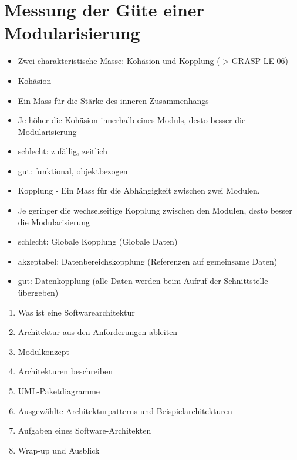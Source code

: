 \documentclass[10pt]{article}
\begin{document}
\section*{Messung der Güte einer Modularisierung}
\begin{itemize}
  \item Zwei charakteristische Masse: Kohäsion und Kopplung (-> GRASP LE 06)
  \item Kohäsion
  \item Ein Mass für die Stärke des inneren Zusammenhangs
  \item Je höher die Kohäsion innerhalb eines Moduls, desto besser die Modularisierung
  \item schlecht: zufällig, zeitlich
  \item gut: funktional, objektbezogen
  \item Kopplung - Ein Mass für die Abhängigkeit zwischen zwei Modulen.
  \item Je geringer die wechselseitige Kopplung zwischen den Modulen, desto besser die Modularisierung
  \item schlecht: Globale Kopplung (Globale Daten)
  \item akzeptabel: Datenbereichskopplung (Referenzen auf gemeinsame Daten)
  \item gut: Datenkopplung (alle Daten werden beim Aufruf der Schnittstelle übergeben)
\end{itemize}

\begin{enumerate}
  \item Was ist eine Softwarearchitektur
  \item Architektur aus den Anforderungen ableiten
  \item Modulkonzept
  \item Architekturen beschreiben
  \item UML-Paketdiagramme
  \item Ausgewählte Architekturpatterns und Beispielarchitekturen
  \item Aufgaben eines Software-Architekten
  \item Wrap-up und Ausblick
\end{enumerate}
\end{document}

